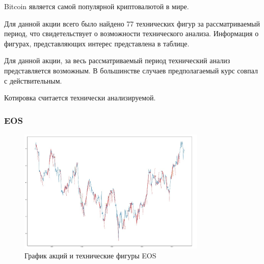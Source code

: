 \documentclass[bachelor, och, coursework]{SCWorks}
\begin{document}
        Bitcoin является самой популярной криптовалютой в мире.

        Для данной акции всего было найдено 77 технических фигур за 
        рассматриваемый период, что свидетельствует о возможности технического 
        анализа. Информация о фигурах, представляющих интерес представлена в 
        таблице.
        
        Для данной акции, за весь рассматриваемый период технический анализ 
        представляется возможным. В большинстве случаев предполагаемый курс 
        совпал с действительным.
        
        Котировка считается технически анализируемой.

        \subsubsection{EOS}
    
        \begin{figure}[H]
            \centering
            \includegraphics[width=0.8\textwidth]{pic/EOS.jpg}
            \caption{График акций и технические фигуры EOS}
        \end{figure}
       
\end{document}
